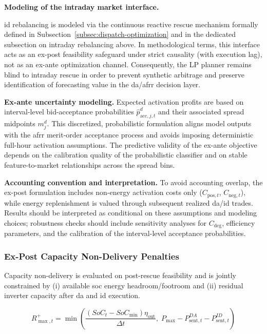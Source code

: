 \textbf{Modeling of the intraday market interface.}

\gls{id} rebalancing is modeled via the continuous reactive rescue mechanism formally defined in Subsection~\ref{subsec:dispatch-optimization} and in the dedicated subsection on intraday rebalancing above. In methodological terms, this interface acts as an ex-post feasibility safeguard under strict causality (with execution lag), not as an ex-ante optimization channel. Consequently, the LP planner remains blind to intraday rescue in order to prevent synthetic arbitrage and preserve identification of forecasting value in the \gls{da}/\gls{afrr} decision layer.

\textbf{Ex-ante uncertainty modeling.}
Expected activation profits are based on interval-level bid-acceptance probabilities $\hat{p}_{\text{acc}, j, t}^{d}$ and their associated spread midpoints $m_{j}^{d}$.
This discretized, probabilistic formulation aligns model outputs with the \gls{afrr} merit-order acceptance process and avoids imposing deterministic full-hour activation assumptions.
The predictive validity of the ex-ante objective depends on the calibration quality of the probabilistic classifier and on stable feature-to-market relationships across the spread bins.

\textbf{Accounting convention and interpretation.}
To avoid accounting overlap, the ex-post formulation includes non-energy activation costs only ($C_{\text{pos}, t}$, $C_{\text{neg}, t}$), while energy replenishment is valued through subsequent realized \gls{da}/\gls{id} trades.
Results should be interpreted as conditional on these assumptions and modeling choices; robustness checks should include sensitivity analyses for $C_{\text{deg}}$, efficiency parameters, and the calibration of the interval-level acceptance probabilities.


\subsubsection{Ex-Post Capacity Non-Delivery Penalties}
Capacity non-delivery is evaluated on post-rescue feasibility and is jointly constrained by (i) available \gls{soc} energy headroom/footroom and (ii) residual inverter capacity after \gls{da} and \gls{id} execution.

\begin{equation}\label{eq:rmax-pos}
    R^{+}_{\max,t}
    =
    \min\!\left(
    \frac{(SoC_t-SoC_{\min})\eta_{\text{out}}}{\Delta t},
    \;
    P_{\text{max}}-P^{DA}_{\mathrm{sent},t}-P^{ID}_{\mathrm{sent},t}
    \right)
\end{equation}

